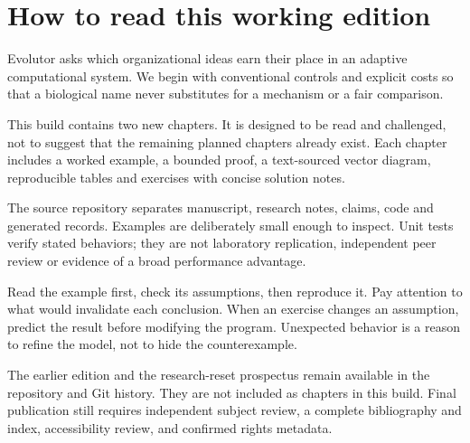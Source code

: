 \chapter*{How to read this working edition}

Evolutor asks which organizational ideas earn their place in an adaptive computational system. We begin with conventional controls and explicit costs so that a biological name never substitutes for a mechanism or a fair comparison.

This build contains two new chapters. It is designed to be read and challenged,
not to suggest that the remaining planned chapters already exist. Each chapter
includes a worked example, a bounded proof, a text-sourced vector diagram,
reproducible tables and exercises with concise solution notes.

The source repository separates manuscript, research notes, claims, code and
generated records. Examples are deliberately small enough to inspect. Unit
tests verify stated behaviors; they are not laboratory replication, independent
peer review or evidence of a broad performance advantage.

Read the example first, check its assumptions, then reproduce it. Pay attention
to what would invalidate each conclusion. When an exercise changes an
assumption, predict the result before modifying the program. Unexpected
behavior is a reason to refine the model, not to hide the counterexample.

The earlier edition and the research-reset prospectus remain available in the
repository and Git history. They are not included as chapters in this build.
Final publication still requires independent subject review, a complete
bibliography and index, accessibility review, and confirmed rights metadata.
